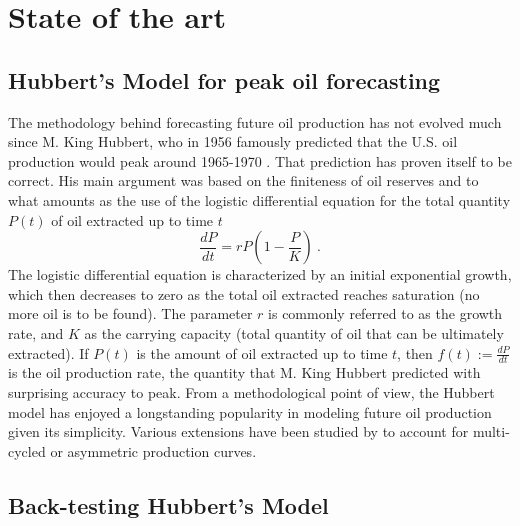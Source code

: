 \documentclass[review]{elsarticle}
\begin{document}
\section{State of the art}

\subsection{Hubbert's Model for peak oil forecasting}

The methodology behind forecasting future oil production has not
evolved much since M. King Hubbert, who in 1956 famously predicted
that the U.S. oil production would peak around 1965-1970 \citep{Hubbert1956}.
That prediction has proven itself to be correct. His main argument
was based on the finiteness of oil reserves and to what amounts
as the use of the logistic differential equation for the total
quantity $P(t)$ of oil extracted up to time $t$
\begin{equation}
\frac{dP}{dt}=rP\left(1-\frac{P}{K}\right)~.
\label{logistic}
\end{equation}
The logistic differential equation
is characterized by an initial exponential growth, which then decreases
to zero as the total oil extracted reaches saturation (no more oil
is to be found). The parameter $r$ is commonly referred to as the
growth rate, and $K$ as the carrying capacity (total quantity of
oil that can be ultimately extracted). If $P(t)$ is the amount of oil extracted up to
time $t$, then $f(t) := \frac{dP}{dt}$ is the oil production rate, the quantity
that M. King Hubbert predicted with surprising accuracy to peak. From
a methodological point of view, the Hubbert model has enjoyed a longstanding
popularity in modeling future oil production given its simplicity.
Various extensions have been studied by \citet{Brandt2007}
to account for multi-cycled or asymmetric production curves.

\subsection{Back-testing Hubbert's Model}
\end{document}
